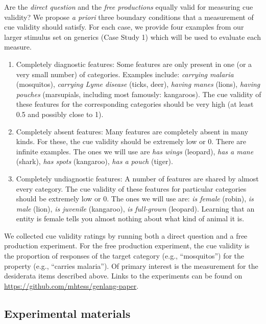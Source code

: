 \documentclass[english,,man,floatsintext]{apa6}
\theoremstyle{definition}
\theoremstyle{definition}
\theoremstyle{definition}
\theoremstyle{remark}
\begin{document}
Are the \emph{direct question} and the \emph{free productions} equally
valid for measuring cue validity? We propose \emph{a priori} three
boundary conditions that a measurement of cue validity should satisfy.
For each case, we provide four examples from our larger stimulus set on
generics (Case Study 1) which will be used to evaluate each measure.

\begin{enumerate}
\item{Completely diagnostic features: Some features are only present in one (or a very small number) of categories. Examples include: \emph{carrying malaria} (mosquitos), \emph{carrying Lyme disease} (ticks, deer), \emph{having manes} (lions), \emph{having pouches} (marsupials, including most famously: kangaroos). The cue validity of these features for the corresponding categories should be very high (at least 0.5 and possibly close to 1).}
\item{Completely absent features: Many features are completely absent in many kinds. For these, the cue validity should be extremely low or 0. There are infinite examples. The ones we will use are \emph{has wings} (leopard), \emph{has a mane} (shark), \emph{has spots} (kangaroo), \emph{has a pouch} (tiger). }
\item{Completely undiagnostic features: A number of features are shared by almost every category. The cue validity of these features for particular categories should be extremely low or 0. The ones we will use are: \emph{is female} (robin), \emph{is male} (lion), \emph{is juvenile} (kangaroo), \emph{is full-grown} (leopard).  Learning that an entity is female tells you almost nothing about what kind of animal it is.}
\end{enumerate}

We collected cue validity ratings by running both a direct question and
a free production experiment. For the free production experiment, the
cue validity is the proportion of responses of the target category
(e.g., \enquote{mosquitos}) for the property (e.g., \enquote{carries
malaria}). Of primary interest is the measurement for the desiderata
items described above. Links to the experiments can be found on
\url{https://github.com/mhtess/genlang-paper}.

\hypertarget{experimental-materials}{%
\subsection{Experimental materials}\label{experimental-materials}}
\end{document}
